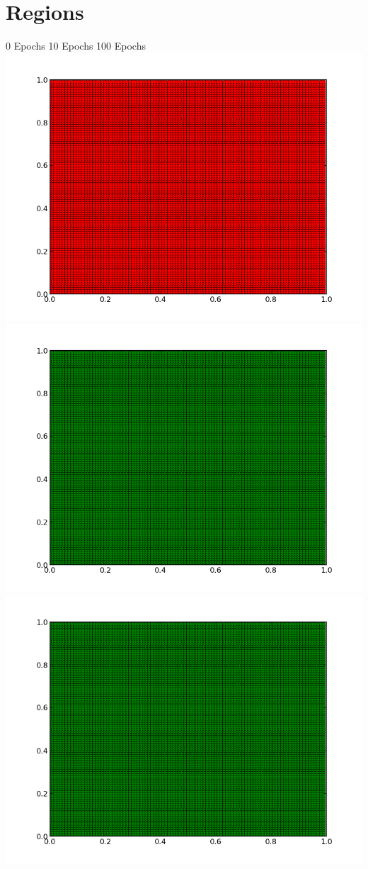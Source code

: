 \documentclass{book}
\begin{document}
\section*{Regions}
\hspace{50px}0 Epochs \hspace{80px}10 Epochs \hspace{100px}100 Epochs \\
\includegraphics[scale=0.25]{0classregions.png}
\includegraphics[scale=0.25]{10classregions.png}
\includegraphics[scale=0.25]{100classregions.png}\\
\end{document}
